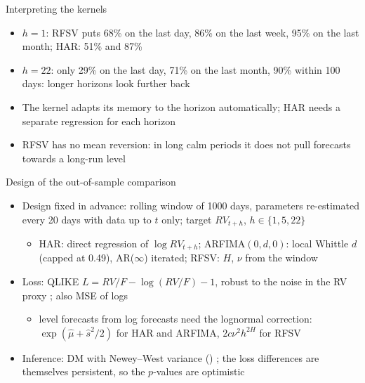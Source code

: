 \begin{frame}{Interpreting the kernels}
\itemsize{\small}
\begin{itemize}
    \item $h = 1$: RFSV puts 68\% on the last day, 86\% on the last week, 95\% on the last month; HAR: 51\% and 87\%
    \item $h = 22$: only 29\% on the last day, 71\% on the last month, 90\% within 100 days: longer horizons look further back
    \item The kernel adapts its memory to the horizon automatically; HAR needs a separate regression for each horizon
    \item RFSV has no mean reversion: in long calm periods it does not pull forecasts towards a long-run level
\end{itemize}
\end{frame}

\begin{frame}{Design of the out-of-sample comparison}
\itemsize{\small}
\begin{itemize}
    \item Design fixed in advance: rolling window of 1000 days, parameters re-estimated every 20 days with data up to $t$ only; target $RV_{t+h}$, $h \in \{1, 5, 22\}$
    \begin{itemize}
        \item HAR: direct regression of $\log RV_{t+h}$; ARFIMA$(0,d,0)$: local Whittle $d$ (capped at 0.49), AR($\infty$) iterated; RFSV: $H$, $\nu$ from the window
    \end{itemize}
    \item Loss: QLIKE $L = RV/F - \log(RV/F) - 1$, robust to the noise in the RV proxy ; also MSE of logs
    \begin{itemize}
        \item level forecasts from log forecasts need the lognormal correction: $\exp(\hat\mu + \hat s^2/2)$ for HAR and ARFIMA, $2c\nu^2h^{2H}$ for RFSV
    \end{itemize}
    \item Inference: DM with Newey--West variance () ; the loss differences are themselves persistent, so the $p$-values are optimistic
\end{itemize}
\end{frame}

